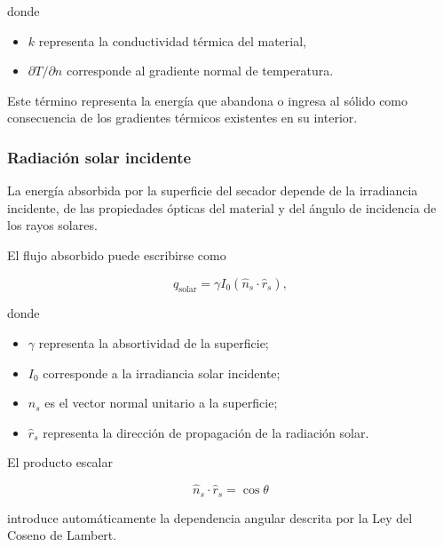 donde

\begin{itemize}

\item $k$ representa la conductividad térmica del material,

\item $\partial T/\partial n$ corresponde al gradiente normal de temperatura.

\end{itemize}

Este término representa la energía que abandona o ingresa al sólido como consecuencia de los gradientes térmicos existentes en su interior.

\subsubsection{Radiación solar incidente}

La energía absorbida por la superficie del secador depende de la irradiancia incidente, de las propiedades ópticas del material y del ángulo de incidencia de los rayos solares.

El flujo absorbido puede escribirse como

\begin{equation}
q_{\mathrm{solar}}
=
\gamma
I_0
(\hat n_s\cdot\hat r_s),
\label{eq:qsolar}
\end{equation}

donde

\begin{itemize}

\item $\gamma$ representa la absortividad de la superficie;

\item $I_0$ corresponde a la irradiancia solar incidente;

\item $\hat n_s$ es el vector normal unitario a la superficie;

\item $\hat r_s$ representa la dirección de propagación de la radiación solar.

\end{itemize}

El producto escalar

\[
\hat n_s\cdot\hat r_s=\cos\theta
\]

introduce automáticamente la dependencia angular descrita por la Ley del Coseno de Lambert.

